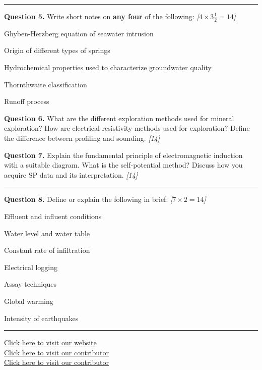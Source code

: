 \documentclass[11pt,a4paper]{article}
\newcommand{\pts}[1]{\hfill   \textit{[#1]}}
\begin{document}
\bigskip


\rule{\linewidth}{0.4pt}\smallskip




\noindent   \textbf{Question 5.} Write short notes on   \textbf{any four} of the following: \pts{$4  \times 3\frac{1}{2} = 14$}

\begin{parts}
  \item Ghyben-Herzberg equation of seawater intrusion
  \item Origin of different types of springs
  \item Hydrochemical properties used to characterize groundwater quality
  \item Thornthwaite classification
  \item Runoff process
\end{parts}

\medskip


\noindent   \textbf{Question 6.} What are the different exploration methods used for mineral exploration? How are electrical resistivity methods used for exploration? Define the difference between profiling and sounding. \pts{14}

\medskip


\noindent   \textbf{Question 7.} Explain the fundamental principle of electromagnetic induction with a suitable diagram. What is the self-potential method? Discuss how you acquire SP data and its interpretation. \pts{14}

\bigskip


\rule{\linewidth}{0.4pt}\smallskip




\noindent   \textbf{Question 8.} Define or explain the following in brief: \pts{$7  \times 2 = 14$}

\begin{parts}
  \item Effluent and influent conditions
  \item Water level and water table
  \item Constant rate of infiltration
  \item Electrical logging
  \item Assay techniques
  \item Global warming
  \item Intensity of earthquakes
\end{parts}

\vfill\rule{\linewidth}{0.4pt}

\begin{center}\small
\href{https://bhu-exam.vercel.app/}{Click here to visit our website}\\[4pt]
\href{https://me-aryan.vercel.app/}{Click here to visit our contributor}\\[4pt]
\href{https://quashan-me.vercel.app/}{Click here to visit our contributor}
\end{center}
\end{document}
